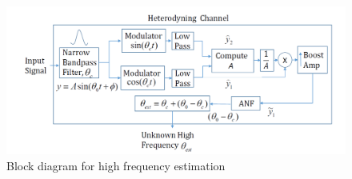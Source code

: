 \documentclass{UCF_ETD}
\begin{document}
 \begin{figure}[H]
\begin{center}
\includegraphics[scale=0.5]{NonuniformANF/HeterodyningChannel}
\caption{Block diagram for high frequency estimation}
\label{HeterodyningChannel.fig}
\end{center}
\end{figure}
\end{document}

